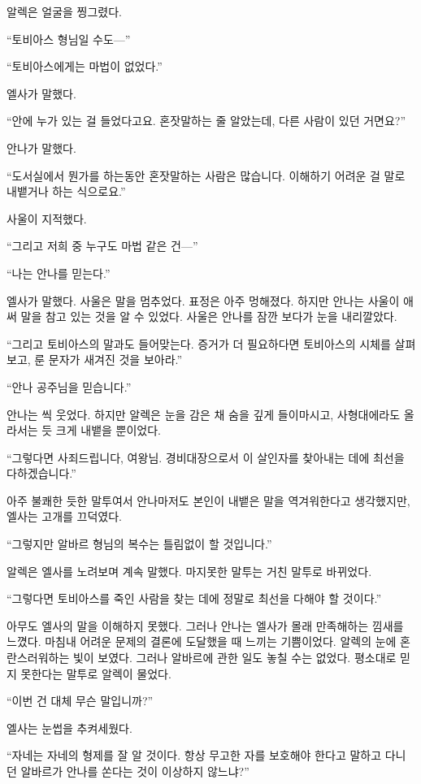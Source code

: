알렉은 얼굴을 찡그렸다.

``토비아스 형님일 수도—''

``토비아스에게는 마법이 없었다.''

엘사가 말했다.

``안에 누가 있는 걸 들었다고요. 혼잣말하는 줄 알았는데, 다른 사람이 있던 거면요?''

안나가 말했다.

``도서실에서 뭔가를 하는동안 혼잣말하는 사람은 많습니다. 이해하기 어려운 걸 말로 내뱉거나 하는 식으로요.''

사울이 지적했다.

``그리고 저희 중 누구도 마법 같은 건—''

``나는 안나를 믿는다.''

엘사가 말했다. 사울은 말을 멈추었다. 표정은 아주 멍해졌다. 하지만 안나는 사울이 애써 말을 참고 있는 것을 알 수 있었다. 사울은 안나를 잠깐 보다가 눈을 내리깔았다.

``그리고 토비아스의 말과도 들어맞는다. 증거가 더 필요하다면 토비아스의 시체를 살펴보고, 룬 문자가 새겨진 것을 보아라.''

`` 안나 공주님을 믿습니다.''

안나는 씩 웃었다. 하지만 알렉은 눈을 감은 채 숨을 깊게 들이마시고, 사형대에라도 올라서는 듯 크게 내뱉을 뿐이었다.

``그렇다면 사죄드립니다, 여왕님. 경비대장으로서 이 살인자를 찾아내는 데에 최선을 다하겠습니다.''

아주 불쾌한 듯한 말투여서 안나마저도 본인이 내뱉은 말을 역겨워한다고 생각했지만, 엘사는 고개를 끄덕였다.

``그렇지만 알바르 형님의 복수는 틀림없이 할 것입니다.''

알렉은 엘사를 노려보며 계속 말했다. 마지못한 말투는 거친 말투로 바뀌었다.

``그렇다면 토비아스를 죽인 사람을 찾는 데에 정말로 최선을 다해야 할 것이다.''

아무도 엘사의 말을 이해하지 못했다. 그러나 안나는 엘사가 몰래 만족해하는 낌새를 느꼈다. 마침내 어려운 문제의 결론에 도달했을 때 느끼는 기쁨이었다. 알렉의 눈에 혼란스러워하는 빛이 보였다. 그러나 알바르에 관한 일도 놓칠 수는 없었다. 평소대로 믿지 못한다는 말투로 알렉이 물었다.

``이번 건 대체 무슨 말입니까?''

엘사는 눈썹을 추켜세웠다.

``자네는 자네의 형제를 잘 알 것이다. 항상 무고한 자를 보호해야 한다고 말하고 다니던 알바르가 안나를 쏜다는 것이 이상하지 않느냐?''

